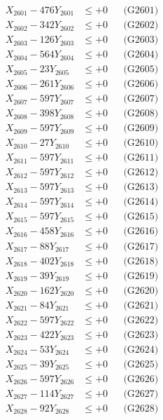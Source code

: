 \documentclass[a4paper,10pt]{article}
\begin{document}
{\begin{align}
\allowbreak
X_{2601} - 476Y_{2601} &\leq +0 && \text{(G2601)} \\
X_{2602} - 342Y_{2602} &\leq +0 && \text{(G2602)} \\
X_{2603} - 126Y_{2603} &\leq +0 && \text{(G2603)} \\
X_{2604} - 564Y_{2604} &\leq +0 && \text{(G2604)} \\
X_{2605} - 23Y_{2605} &\leq +0 && \text{(G2605)} \\
X_{2606} - 261Y_{2606} &\leq +0 && \text{(G2606)} \\
X_{2607} - 597Y_{2607} &\leq +0 && \text{(G2607)} \\
X_{2608} - 398Y_{2608} &\leq +0 && \text{(G2608)} \\
X_{2609} - 597Y_{2609} &\leq +0 && \text{(G2609)} \\
X_{2610} - 27Y_{2610} &\leq +0 && \text{(G2610)} \\
\allowbreak
X_{2611} - 597Y_{2611} &\leq +0 && \text{(G2611)} \\
X_{2612} - 597Y_{2612} &\leq +0 && \text{(G2612)} \\
X_{2613} - 597Y_{2613} &\leq +0 && \text{(G2613)} \\
X_{2614} - 597Y_{2614} &\leq +0 && \text{(G2614)} \\
X_{2615} - 597Y_{2615} &\leq +0 && \text{(G2615)} \\
X_{2616} - 458Y_{2616} &\leq +0 && \text{(G2616)} \\
X_{2617} - 88Y_{2617} &\leq +0 && \text{(G2617)} \\
X_{2618} - 402Y_{2618} &\leq +0 && \text{(G2618)} \\
X_{2619} - 39Y_{2619} &\leq +0 && \text{(G2619)} \\
X_{2620} - 162Y_{2620} &\leq +0 && \text{(G2620)} \\
\allowbreak
X_{2621} - 84Y_{2621} &\leq +0 && \text{(G2621)} \\
X_{2622} - 597Y_{2622} &\leq +0 && \text{(G2622)} \\
X_{2623} - 422Y_{2623} &\leq +0 && \text{(G2623)} \\
X_{2624} - 53Y_{2624} &\leq +0 && \text{(G2624)} \\
X_{2625} - 39Y_{2625} &\leq +0 && \text{(G2625)} \\
X_{2626} - 597Y_{2626} &\leq +0 && \text{(G2626)} \\
X_{2627} - 114Y_{2627} &\leq +0 && \text{(G2627)} \\
X_{2628} - 92Y_{2628} &\leq +0 && \text{(G2628)} \\

\end{align}}
\end{document}
